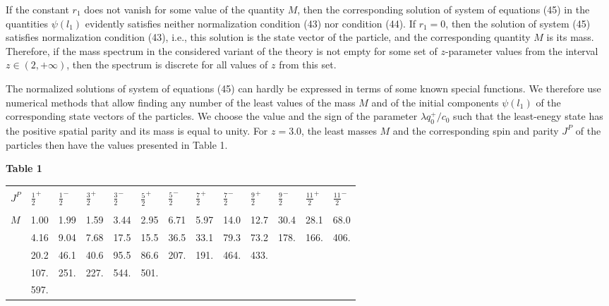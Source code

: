 \documentclass[a4paper,12pt]{article}
\begin{document}
If the constant $r_{1}$ does not vanish for some value of the quantity $M$,
then the corresponding solution of system of equations (45) in the quantities
$\psi (l_{1})$ evidently satisfies neither normalization condition (43) nor
condition (44). If $r_{1}=0$, then the solution of system (45) satisfies
normalization condition (43), i.e., this solution is the state vector of the
particle, and the corresponding quantity $M$ is its mass. Therefore, if the 
mass spectrum in the considered variant of the theory is not empty for some set
of $z$-parameter values from the interval $z \in (2, +\infty)$, then the 
spectrum is discrete for all values of $z$ from this set.

The normalized solutions of system of equations (45) can hardly be expressed in
terms of some known special functions. We therefore use numerical methods that
allow finding any number of the least values of the mass $M$ and of the
initial components $\psi (l_{1})$ of the corresponding state vectors of the
particles. We choose the value and the sign of the parameter 
$\lambda q_{0}^{+}/c_{0}$ such that the least-enegy state has the positive
spatial parity and its mass is equal to unity. For $z=3.0$, the least masses 
$M$ and the corresponding spin and parity $J^{P}$ of the particles then have 
the values presented in Table 1.

\vspace{0.3 cm}
\hspace{13.3 cm} {\bf Table 1}
\begin{center}
\begin{tabular}
{|p{5.8 mm}|p{7.8 mm}|p{7.8 mm}|p{7.8 mm}|p{7.8 mm}|p{7.8 mm}|
p{7.8 mm}|p{7.8 mm}|p{7.8 mm}|p{7.8 mm}|p{7.8 mm}|p{7.8 mm}|p{7.8 mm}|} 
\hline
& & & & & & & & & & & & \\
$J^{P}$ &$\frac{1}{2}^{+}$ &$\frac{1}{2}^{-}$ &$\frac{3}{2}^{+}$ 
&$\frac{3}{2}^{-}$ &$\frac{5}{2}^{+}$ &$\frac{5}{2}^{-}$ 
&$\frac{7}{2}^{+}$ &$\frac{7}{2}^{-}$ &$\frac{9}{2}^{+}$ 
&$\frac{9}{2}^{-}$ &$\frac{11}{2}^{+}$ &$\frac{11}{2}^{-}$\\
& & & & & & & & & & & & \\
\hline
$M$ &1.00 &1.99 &1.59 &3.44 &2.95 &6.71 &5.97 &14.0 &12.7 &30.4 &28.1 &68.0
\\ 
 &4.16 &9.04 &7.68 &17.5 &15.5 &36.5 &33.1 &79.3 &73.2 &178. &166. &406.
\\
 &20.2 &46.1 &40.6 &95.5 &86.6 &207. &191. &464. &433. & & &
\\
 &107. &251. &227. &544. &501. & & & & & & &
\\
 &597. & & & & & & & & & & &
\\
\hline
\end{tabular}
\end{center}
\end{document}
